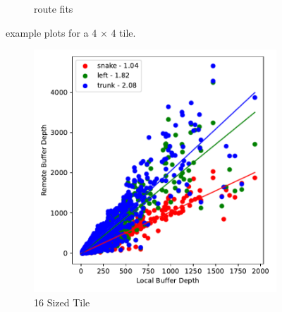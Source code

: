 \begin{figure}
\begin{subfigure}[b]{0.475\textwidth}
      \caption[]%
      {{\small route fits}}    
  \end{subfigure}
  \caption[ Information on the 4 by 4 tile. ]
  {\small example plots for a 4 $\times$ 4 tile. } 
  \label{fig:mp60_plots_for_digital_sim}
\end{figure}

\begin{figure}
  \centering
  \begin{subfigure}[b]{0.475\textwidth}
      \centering
      \includegraphics[width=\textwidth]{./images/mp60_16_fast_route_fits.pdf}
      \caption[]%
      {\small 16 Sized Tile}    
  \end{subfigure}
  \hfill
  \begin{subfigure}[b]{0.475\textwidth}  
      \centering 

\end{subfigure}
\end{figure}
